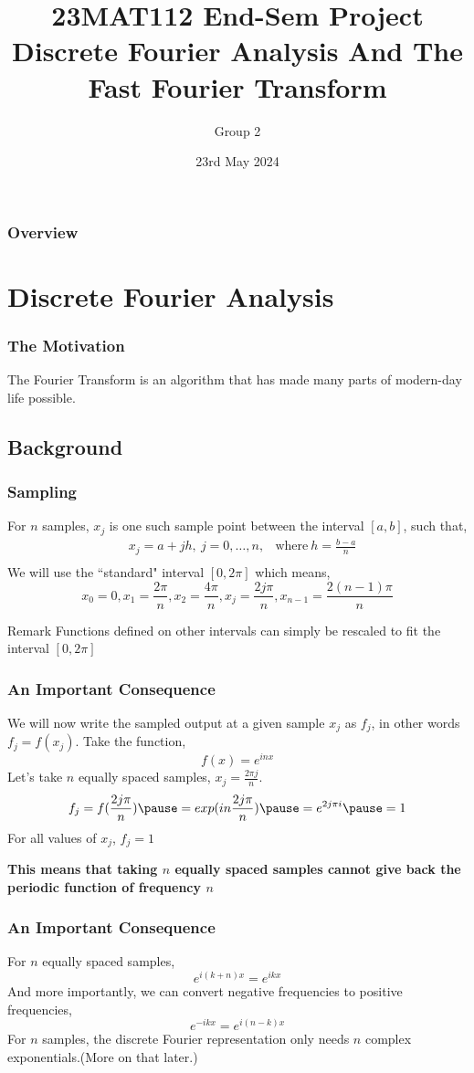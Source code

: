 \documentclass{beamer}
\title{23MAT112 End-Sem Project \\ Discrete Fourier Analysis And The Fast Fourier Transform}
\author{Group 2}
\institute{Amrita Vishwa Vidyapeetham}
\date{23rd May 2024}
\begin{document}
\maketitle
\begin{frame}
\frametitle{Overview}
\tableofcontents
\end{frame}
\section{Discrete Fourier Analysis}
\begin{frame}
	\frametitle{The Motivation}
	The Fourier Transform is an algorithm that has made many parts of modern-day life possible.
\end{frame}
	\subsection{Background}
\begin{frame}
		\frametitle{Sampling}
For $n$ samples, $x_j$ is one such sample point between the interval $[a,b]$, such that,
		\begin{align*}
	&x_j = a + jh, \ j = 0, \dots, n, & \text{where} \ h = \frac{b-a}{n} \\
		\end{align*}
		\pause
		We will use the ``standard" interval $[0,2\pi]$ which means,
		\[
				x_0 = 0, x_1 = \frac{2\pi}{n}, x_2 = \frac{4\pi}{n}, x_j = \frac{2j\pi}{n}, x_{n-1} = \frac{2(n-1)\pi}{n}
		\]
		\pause
		\begin{block}{Remark}
			Functions defined on other intervals can simply be rescaled to fit the interval $[0,2\pi]$
		\end{block}
\end{frame}
\begin{frame}
\frametitle{An Important Consequence}
We will now write the sampled output at a given sample $x_j$ as $f_j$, in other words $f_j = f(x_j)$.
\linebreak
Take the function,
\[
	f(x) = e^{inx}
\]
Let's take $n$ equally spaced samples, $x_j = \frac{2\pi j }{n}$.
\[
	f_j = f(\frac{2j \pi}{n}) \pause = exp(in \frac{2j\pi}{n}) \pause = e^{2j\pi i} \pause = 1
\]
For all values of $x_j$, $f_j = 1$
\pause

\textbf{This means that taking $n$ equally spaced samples cannot give back the periodic function of frequency $n$}
\end{frame}
\begin{frame}
	\frametitle{An Important Consequence}
	For $n$ equally spaced samples,
	\[
		e^{i(k+n)x} = e^{ikx}
	\]
	\pause
	And more importantly, we can convert negative frequencies to positive frequencies,
	\[
		e^{-ikx} = e^{i(n-k)x} 
	\]
	\pause
	For $n$ samples, the discrete Fourier representation only needs $n$ complex exponentials.(More on that later.)
\end{frame}
\end{document}
